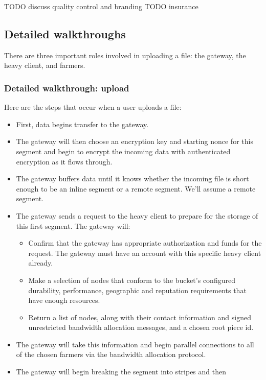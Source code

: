 \documentclass[a4paper,10pt]{article} \usepackage[utf8]{inputenc}
\newcommand{\todo}[1]{{\color{red} TODO #1 }}
\begin{document}
\todo{discuss quality control and branding}
\todo{insurance}

\subsection{Detailed walkthroughs}

There are three important roles involved in uploading a file: the gateway, the heavy client, and farmers.

\subsubsection{Detailed walkthrough: upload}

Here are the steps that occur when a user uploads a file:

\begin{itemize}
\item First, data begins transfer to the gateway.
\item The gateway will then choose an encryption key and starting nonce for
  this segment and begin to encrypt the incoming data with authenticated
  encryption as it flows through.
\item The gateway buffers data until it knows whether the incoming file is
short enough to be an inline segment or a remote segment. We'll assume a remote
segment.
\item The gateway sends a request to the heavy client to prepare for the storage
of this first segment. The gateway will:
  \begin{itemize}
  \item Confirm that the gateway has appropriate authorization and funds for
    the request. The gateway must have an account with this specific heavy
    client already.
  \item Make a selection of nodes that conform to the bucket's configured
    durability, performance, geographic and reputation requirements that have
    enough resources.
  \item Return a list of nodes, along with their contact information and
    signed unrestricted bandwidth allocation messages, and a chosen root piece
    id.
  \end{itemize}
\item The gateway will take this information and begin parallel connections to
  all of the chosen farmers via the bandwidth allocation protocol.
\item The gateway will begin breaking the segment into stripes and then

\end{itemize}
\end{document}
